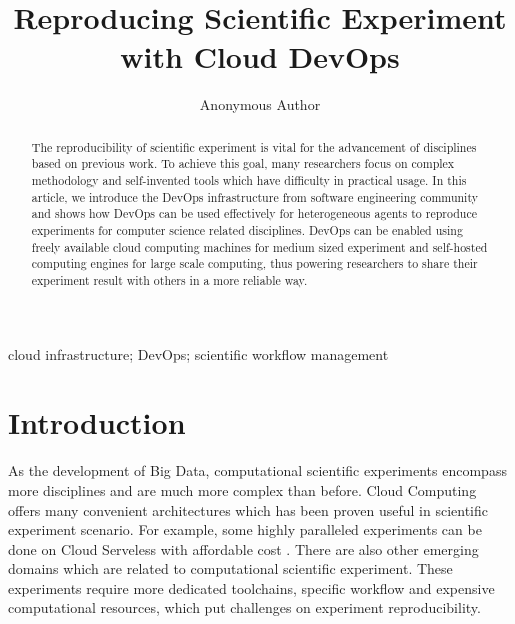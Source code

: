 \documentclass[10pt, conference, compsocconf]{IEEEtran}
\begin{document}

\title{Reproducing Scientific Experiment with Cloud DevOps}

\author{Anonymous Author}
\maketitle
\begin{abstract}
The reproducibility of scientific experiment is vital for the advancement of disciplines based on previous work. To achieve this goal, many researchers focus on complex methodology and self-invented tools which have difficulty in practical usage. In this article, we introduce the DevOps infrastructure from software engineering community and shows how DevOps can be used effectively for heterogeneous agents to reproduce experiments for computer science related disciplines. DevOps can be enabled using freely available cloud computing machines for medium sized experiment and self-hosted computing engines for large scale computing, thus powering researchers to share their experiment result with others in a more reliable way.
\end{abstract}
\begin{IEEEkeywords}
cloud infrastructure; DevOps; scientific workflow management
\end{IEEEkeywords}

\section{Introduction}
As the development of Big Data, computational scientific experiments encompass more disciplines and are much more complex than before. Cloud Computing offers many convenient architectures which has been proven useful in scientific experiment scenario.  For example, some highly paralleled experiments can be done on Cloud Serveless with affordable cost \cite{niu2019leveraging}. There are also other emerging domains which are related to computational scientific experiment. These experiments require more dedicated toolchains, specific workflow and expensive computational resources, which put challenges on experiment reproducibility.
\end{document}
